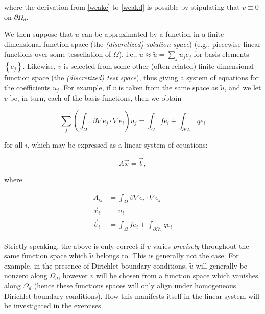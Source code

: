 \documentclass{article}
\begin{document}
where the derivation from \eqref{weakc} to \eqref{weakd} is possible by stipulating that \(v \equiv 0\) on \(\partial \Omega_d\).

We then suppose that \(u\) can be approximated by a function in a finite-dimensional function space (the {\em (discretized) solution space}) (e.g., piecewise linear functions over some tessellation of \(\Omega\)), i.e., \(u \approx \tilde{u} = \sum_j u_j e_j\) for basis elements \(\left\{ e_j \right\}\).  Likewise, \(v\) is selected from some other (often related) finite-dimensional function space (the {\em (discretized) test space}), thus giving a system of equations for the coefficients \(u_j\).  For example, if \(v\) is taken from the same space as \(\tilde{u}\), and we let \(v\) be, in turn, each of the basis functions, then we obtain

\begin{equation}\label{eqi}
\sum_j \left( \int_{\Omega} \beta \nabla e_j \cdot \nabla e_i \right) u_j = \int_{\Omega} f e_i + \int_{\partial \Omega_n} q e_i
\end{equation}

for all \(i\), which may be expressed as a linear system of equations:

\begin{equation}\label{linearsystemi}
A \vec{x} = \vec{b},
\end{equation}

where

\begin{subequations}\label{linearsystemii}
\begin{align}
A_{ij} & = \int_{\Omega} \beta \nabla e_i \cdot \nabla e_j \label{Aij} \\
\vec{x}_i & = u_i \\
\vec{b}_i & = \int_{\Omega} f e_i + \int_{\partial \Omega_n} q e_i \label{bi}
\end{align}
\end{subequations}

Strictly speaking, the above is only correct if \(v\) varies {\em precisely} throughout the same function space which \(\tilde{u}\) belongs to.  This is generally not the case.  For example, in the presence of Dirichlet boundary conditions, \(\tilde{u}\) will generally be nonzero along \(\Omega_d\), however \(v\) will be chosen from a function space which vanishes along \(\Omega_d\) (hence these functions spaces will only align under homogeneous Dirichlet boundary conditions).  How this manifests itself in the linear system will be investigated in the exercises.
\end{document}
